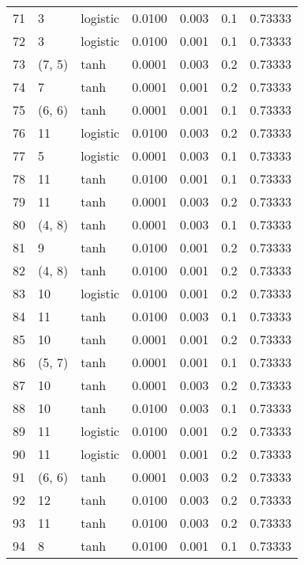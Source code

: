\begin{tabular}{lllrrrr}
71  &           3 &  logistic &  0.0100 &  0.003 &  0.1 &   0.73333 \\
72  &           3 &  logistic &  0.0100 &  0.001 &  0.1 &   0.73333 \\
73  &      (7, 5) &      tanh &  0.0001 &  0.003 &  0.2 &   0.73333 \\
74  &           7 &      tanh &  0.0001 &  0.001 &  0.2 &   0.73333 \\
75  &      (6, 6) &      tanh &  0.0001 &  0.001 &  0.1 &   0.73333 \\
76  &          11 &  logistic &  0.0100 &  0.003 &  0.2 &   0.73333 \\
77  &           5 &  logistic &  0.0001 &  0.003 &  0.1 &   0.73333 \\
78  &          11 &      tanh &  0.0100 &  0.001 &  0.1 &   0.73333 \\
79  &          11 &      tanh &  0.0001 &  0.003 &  0.2 &   0.73333 \\
80  &      (4, 8) &      tanh &  0.0001 &  0.003 &  0.1 &   0.73333 \\
81  &           9 &      tanh &  0.0100 &  0.001 &  0.2 &   0.73333 \\
82  &      (4, 8) &      tanh &  0.0100 &  0.001 &  0.2 &   0.73333 \\
83  &          10 &  logistic &  0.0100 &  0.001 &  0.2 &   0.73333 \\
84  &          11 &      tanh &  0.0100 &  0.003 &  0.1 &   0.73333 \\
85  &          10 &      tanh &  0.0001 &  0.001 &  0.2 &   0.73333 \\
86  &      (5, 7) &      tanh &  0.0001 &  0.001 &  0.1 &   0.73333 \\
87  &          10 &      tanh &  0.0001 &  0.003 &  0.2 &   0.73333 \\
88  &          10 &      tanh &  0.0100 &  0.003 &  0.1 &   0.73333 \\
89  &          11 &  logistic &  0.0100 &  0.001 &  0.2 &   0.73333 \\
90  &          11 &  logistic &  0.0001 &  0.001 &  0.2 &   0.73333 \\
91  &      (6, 6) &      tanh &  0.0001 &  0.003 &  0.2 &   0.73333 \\
92  &          12 &      tanh &  0.0100 &  0.003 &  0.2 &   0.73333 \\
93  &          11 &      tanh &  0.0100 &  0.003 &  0.2 &   0.73333 \\
94  &           8 &      tanh &  0.0100 &  0.001 &  0.1 &   0.73333 \\

\end{tabular}
